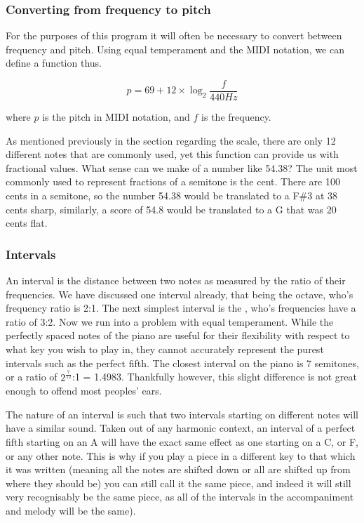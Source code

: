 	
	\subsubsection{Converting from frequency to pitch}
	
	For the purposes of this program it will often be necessary to convert between frequency and pitch. Using equal temperament and the MIDI notation, we can define a function thus.
	
		\[p=69+12\times {\log_2 \frac{f}{440Hz}}\] 
		
	where \(p\) is the pitch in MIDI notation, and \(f\) is the frequency.
	
	As mentioned previously in the section regarding the scale, there are only 12 different notes that are commonly used, yet this function can provide us with fractional values. What sense can we make of a number like 54.38? The unit most commonly used to represent fractions of a semitone is the cent. There are 100 cents in a semitone, so the number 54.38 would be translated to a F\#3 at 38 cents sharp, similarly, a score of 54.8 would be translated to a G that was 20 cents flat.
	
	\subsubsection{Intervals}
	An interval is the distance between two notes as measured by the ratio of their frequencies. We have discussed one interval already, that being the octave, who's frequency ratio is 2:1. The next simplest interval is the , who's frequencies have a ratio of 3:2. Now we run into a problem with equal temperament. While the perfectly spaced notes of the piano are useful for their flexibility with respect to what key you wish to play in, they cannot accurately represent the purest intervals such as the perfect fifth. The closest interval on the piano is 7 semitones, or a ratio of \(2^\frac{7}{12}\):1 = 1.4983. Thankfully however, this slight difference is not great enough to offend most peoples' ears.
	\par The nature of an interval is such that two intervals starting on different notes will have a similar sound. Taken out of any harmonic context, an interval of a perfect fifth starting on an A will have the exact same effect as one starting on a C, or F, or any other note. This is why if you play a piece in a different key to that which it was written (meaning all the notes are shifted down or all are shifted up from where they should be) you can still call it the same piece, and indeed it will still very recognisably be the same piece, as all of the intervals in the accompaniment and melody will be the same).
